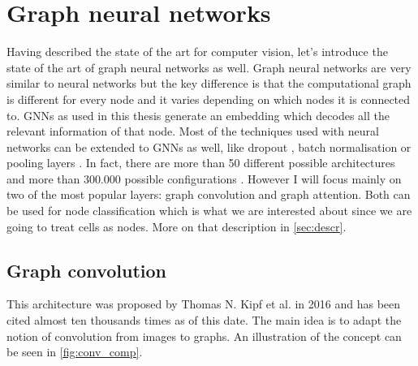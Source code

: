 \section{Graph neural networks}\label{sec:gnn}

Having described the state of the art for computer vision, let's introduce the state of the art of graph neural networks as well. Graph neural networks are very similar to neural networks but the key difference is that the computational graph is different for every node and it varies depending on which nodes it is connected to. GNNs as used in this thesis generate an embedding which decodes all the relevant information of that node. Most of the techniques used with neural networks can be extended to GNNs as well, like dropout \cite{dropout}, batch normalisation \cite{batchnorm} or pooling layers \cite{graph_survey}. In fact, there are more than 50 different possible architectures \cite{graph_survey} and more than 300.000 possible configurations \cite{you2021design}. However I will focus mainly on two of the most popular layers: graph convolution and graph attention. Both can be used for node classification which is what we are interested about since we are going to treat cells as nodes. More on that description in \autoref{sec:descr}.

\subsection{Graph convolution}\label{sec:gcn}

This architecture was proposed by Thomas N. Kipf et al. \cite{graphconv} in 2016 and has been cited almost ten thousands times as of this date. The main idea is to adapt the notion of convolution from images to graphs. An illustration of the concept can be seen in \autoref{fig:conv_comp}.

